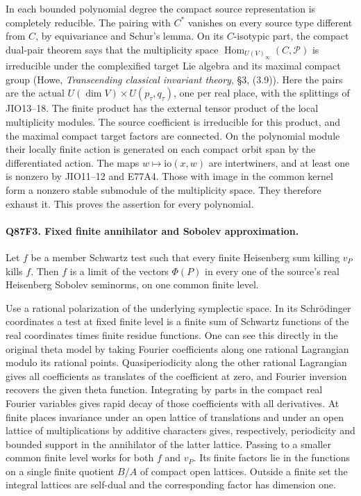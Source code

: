 In each bounded polynomial degree the compact source representation
is completely reducible. The pairing with $C^*$ vanishes on every
source type different from $C$, by equivariance and Schur's lemma.
On its $C$-isotypic part, the compact dual-pair theorem says that the
multiplicity space $\operatorname{Hom}_{U(V)_\infty}(C,\mathcal P)$
is irreducible under the complexified target Lie algebra and its
maximal compact group (Howe, \emph{Transcending classical invariant
theory}, \S3, (3.9)). Here the pairs are the actual
$U(\dim V)\times U(p_\tau,q_\tau)$, one per real place, with the
splittings of JIO13--18. The finite product has the external tensor
product of the local multiplicity modules. The source coefficient is
irreducible for this product, and the maximal compact target factors
are connected. On the polynomial module their locally finite action
is generated on each compact orbit span by the differentiated
action. The maps $w\mapsto\mathrm{io}(x,w)$ are intertwiners,
and at least one is nonzero by JIO11--12 and E77A4. Those with image
in the common kernel form a nonzero stable submodule of the
multiplicity space. They therefore exhaust it. This proves the
assertion for every polynomial.

\paragraph{Q87F3. Fixed finite annihilator and Sobolev approximation.}
Let $f$ be a member Schwartz test such that every finite Heisenberg
sum killing $v_P$ kills $f$. Then $f$ is a limit of the vectors
$\Phi(P)$ in every one of the source's real Heisenberg Sobolev
seminorms, on one common finite level.

Use a rational polarization of the underlying symplectic space.
In its Schr\"odinger coordinates a test at fixed finite level is a
finite sum of Schwartz functions of the real coordinates times
finite residue functions. One can see this directly in the original
theta model by taking Fourier coefficients along one rational
Lagrangian modulo its rational points. Quasiperiodicity along the
other rational Lagrangian gives all coefficients as translates of the
coefficient at zero, and Fourier inversion recovers the given
theta function. Integrating by parts in the compact real Fourier
variables gives rapid decay of those coefficients with all derivatives.
At finite places invariance under an open lattice of translations and
under an open lattice of multiplications by additive characters gives,
respectively, periodicity and bounded support in the annihilator of
the latter lattice. Passing to a smaller common finite level works
for both $f$ and $v_P$. Its finite factors lie in the functions on a
single finite quotient $B/A$ of compact open lattices. Outside a
finite set the integral lattices are self-dual and the corresponding
factor has dimension one.

